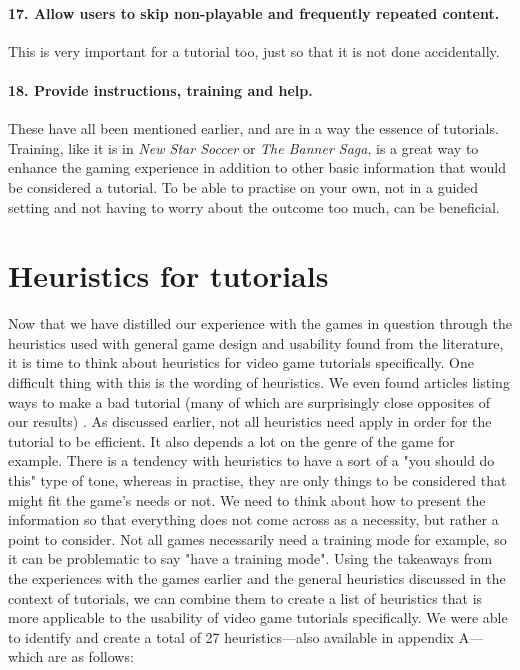 \paragraph{17. Allow users to skip non-playable and frequently repeated content.} This is very important for a tutorial too, just so that it is not done accidentally.

\paragraph{18. Provide instructions, training and help.} These have all been mentioned earlier, and are in a way the essence of tutorials. Training, like it is in \textit{New Star Soccer} or \textit{The Banner Saga}, is a great way to enhance the gaming experience in addition to other basic information that would be considered a tutorial. To be able to practise on your own, not in a guided setting and not having to worry about the outcome too much, can be beneficial.

\section{Heuristics for tutorials}
Now that we have distilled our experience with the games in question through the heuristics used with general game design and usability found from the literature, it is time to think about heuristics for video game tutorials specifically. One difficult thing with this is the wording of heuristics. We even found articles listing ways to make a bad tutorial (many of which are surprisingly close opposites of our results) \cite{Adams2011}. As discussed earlier, not all heuristics need apply in order for the tutorial to be efficient. It also depends a lot on the genre of the game for example. There is a tendency with heuristics to have a sort of a "you should do this" type of tone, whereas in practise, they are only things to be considered that might fit the game's needs or not. We need to think about how to present the information so that everything does not come across as a necessity, but rather a point to consider. Not all games necessarily need a training mode for example, so it can be problematic to say "have a training mode". Using the takeaways from the experiences with the games earlier and the general heuristics discussed in the context of tutorials, we can combine them to create a list of heuristics that is more applicable to the usability of video game tutorials specifically. We were able to identify and create a total of 27 heuristics---also available in appendix A---which are as follows:

